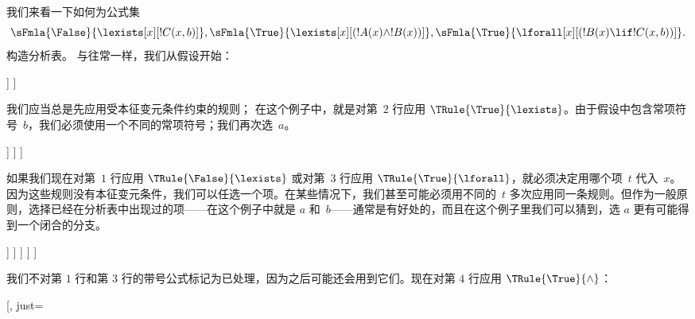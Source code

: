 \documentclass[../../../include/open-logic-section]{subfiles}
\begin{document}
\begin{ex}
我们来看一下如何为公式集
\[
\sFmla{\False}{\lexists[x][!C(x,b)]},
\sFmla{\True}{\lexists[x][(!A(x) \land !B(x))]},
\sFmla{\True}{\lforall[x][(!B(x) \lif !C(x,b))]}.
\]
构造分析表。
与往常一样，我们从假设开始：
\begin{oltableau}
  [\sFmla{\False}{\lexists[x][\formula{C}(x,b)]}, just=\TAss
    [\sFmla{\True}{\lexists[x][(\formula{A}(x) \land \formula{B}(x))]},
      just=\TAss
      [\sFmla{\True}{\lforall[x][(\formula{B}(x) \lif \formula{C}(x,b))]},
        just=\TAss]
    ]
  ]
\end{oltableau}
我们应当总是先应用受本征变元条件约束的规则；
在这个例子中，就是对第~$2$ 行应用 $\TRule{\True}{\lexists}$。由于假设中包含常项符号~$b$，我们必须使用一个不同的常项符号；我们再次选~$a$。
\begin{oltableau}
  [\sFmla{\False}{\lexists[x][\formula{C}(x,b)]}, just=\TAss
    [\sFmla{\True}{\lexists[x][(\formula{A}(x) \land \formula{B}(x))]},
      just=\TAss, checked
      [\sFmla{\True}{\lforall[x][(\formula{B}(x) \lif \formula{C}(x,b))]},
        just=\TAss
        [\sFmla{\True}{\formula{A}(a) \land \formula{B}(a)},
          just={\TRule{\True}{\lexists}[2]}]
      ]
    ]
  ]
\end{oltableau}
如果我们现在对第~$1$ 行应用 $\TRule{\False}{\lexists}$ 或对第~$3$ 行应用 $\TRule{\True}{\lforall}$，就必须决定用哪个项~$t$ 代入~$x$。因为这些规则没有本征变元条件，我们可以任选一个项。在某些情况下，我们甚至可能必须用不同的~$t$ 多次应用同一条规则。但作为一般原则，选择已经在分析表中出现过的项——在这个例子中就是 $a$ 和~$b$——通常是有好处的，而且在这个例子里我们可以猜到，选 $a$ 更有可能得到一个闭合的分支。
\begin{oltableau}
  [\sFmla{\False}{\lexists[x][\formula{C}(x,b)]}, just=\TAss
    [\sFmla{\True}{\lexists[x][(\formula{A}(x) \land \formula{B}(x))]},
      just=\TAss, checked
      [\sFmla{\True}{\lforall[x][(\formula{B}(x) \lif \formula{C}(x,b))]}, just=\TAss
        [\sFmla{\True}{\formula{A}(a) \land \formula{B}(a)}, just={\TRule{\True}{\lexists}[2]}
          [\sFmla{\False}{\formula{C}(a,b)}, just={\TRule{\False}{\lexists}[1]}
            [\sFmla{\True}{\formula{B}(a) \lif \formula{C}(a,b)},
              just={\TRule{\True}{\lforall}[3]}
            ]
          ]
        ]
      ]
    ]
  ]
\end{oltableau}
我们不对第 $1$ 行和第 $3$ 行的带号公式标记为已处理，因为之后可能还会用到它们。现在对第 $4$ 行应用 $\TRule{\True}{\land}$：
\begin{oltableau}
  [\sFmla{\False}{\lexists[x][\formula{C}(x,b)]}, just=\TAss

\end{oltableau}
\end{ex}
\end{document}
